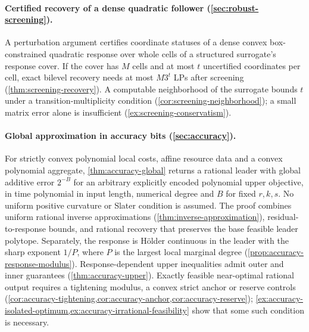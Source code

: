 \paragraph{Certified recovery of a dense quadratic follower (\cref{sec:robust-screening}).}
A perturbation argument certifies coordinate statuses of a dense convex
box-constrained quadratic response over whole cells of a structured
surrogate's response cover. If the cover has $M$ cells and at most $t$
uncertified coordinates per cell, exact bilevel recovery needs at most
$M3^t$ LPs after screening (\cref{thm:screening-recovery}). A computable
neighborhood of the surrogate bounds $t$ under a transition-multiplicity
condition (\cref{cor:screening-neighborhood}); a small matrix error alone
is insufficient (\cref{ex:screening-conservatism}).

\paragraph{Global approximation in accuracy bits (\cref{sec:accuracy}).}
For strictly convex polynomial local costs, affine resource data and a
convex polynomial aggregate, \cref{thm:accuracy-global} returns a rational
leader with global additive error $2^{-B}$ for an arbitrary explicitly
encoded polynomial upper objective, in time polynomial in input length,
numerical degree and $B$ for fixed $r,k,s$. No uniform positive curvature
or Slater condition is assumed. The proof combines uniform rational inverse
approximations (\cref{thm:inverse-approximation}), residual-to-response
bounds, and rational recovery that preserves the base feasible leader
polytope. Separately, the response is H\"older continuous in the leader
with the sharp exponent $1/P$, where $P$ is the largest local marginal
degree (\cref{prop:accuracy-response-modulus}). Response-dependent upper
inequalities admit outer and inner guarantees (\cref{thm:accuracy-upper}).
Exactly feasible near-optimal rational output requires a tightening
modulus, a convex strict anchor or reserve controls
(\cref{cor:accuracy-tightening,cor:accuracy-anchor,cor:accuracy-reserve});
\cref{ex:accuracy-isolated-optimum,ex:accuracy-irrational-feasibility}
show that some such condition is necessary.

